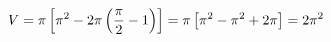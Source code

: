 \documentclass[preview]{standalone}
\begin{document}
\begin{align*}
\special{dvisvgm:raw <g id='unique000'>}V=\pi\left[\pi^2-2\pi\left(\dfrac{\pi}{2}-1\right)\right]=\pi\left[\pi^2-\pi^2+2\pi\right]=2\pi^2\special{dvisvgm:raw </g>}
\end{align*}
\end{document}
